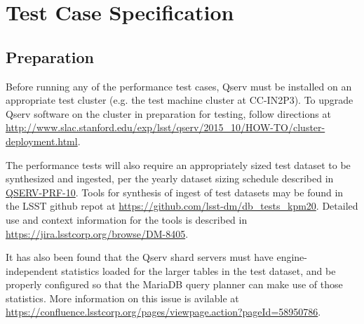 \newpage
\section{Test Case Specification}

\subsection{Preparation}
\label{sec:prep}

Before running any of the performance test cases, Qserv must be installed on an appropriate test cluster (e.g.
the test machine cluster at CC-IN2P3).  To upgrade Qserv software on the cluster in preparation for testing,
follow directions at \url{http://www.slac.stanford.edu/exp/lsst/qserv/2015_10/HOW-TO/cluster-deployment.html}.

The performance tests will also require an appropriately sized test dataset to be synthesized and ingested,
per the yearly dataset sizing schedule described in \hyperref[qserv-prf-10]{\textsc{QSERV-PRF-10}}.  Tools
for synthesis of ingest of test datasets may be found in the LSST github repot at \url{https://github.com/lsst-dm/db_tests_kpm20}.  Detailed use and context information for the tools is described in \url{https://jira.lsstcorp.org/browse/DM-8405}.

It has also been found that the Qserv shard servers must have engine-independent statistics
loaded for the larger tables in the test dataset, and be properly
configured so that the MariaDB query planner can make use of those statistics.  More information on this
issue is avilable at \url{https://confluence.lsstcorp.org/pages/viewpage.action?pageId=58950786}.

\newpage

\newpage

\newpage

\newpage

\newpage

\newpage

\newpage

\newpage

